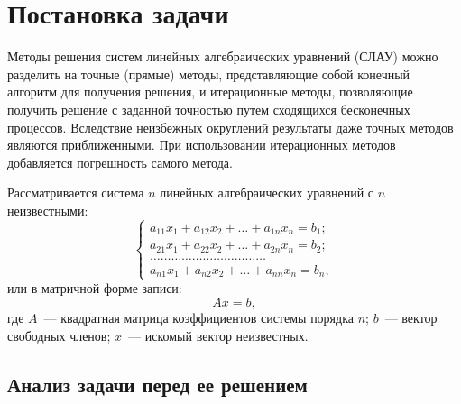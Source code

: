 \chapter{Постановка задачи}

Методы решения систем линейных алгебраических уравнений (СЛАУ) можно разделить на точные (прямые) методы, представляющие собой конечный алгоритм для получения решения, и итерационные методы, позволяющие получить решение с заданной точностью путем сходящихся бесконечных процессов. Вследствие неизбежных округлений результаты даже точных методов являются приближенными. При использовании итерационных методов добавляется погрешность самого метода.

Рассматривается система $n$ линейных алгебраических уравнений с $n$ неизвестными:
\begin{equation}
    \begin{cases}
        a_{11}x_1 + a_{12}x_2 + \ldots + a_{1n}x_n = b_1; \\
        a_{21}x_1 + a_{22}x_2 + \ldots + a_{2n}x_n = b_2; \\
        \dots\dots\dots\dots\dots\dots\dots\dots\dots\dots\dots \\
        a_{n1}x_1 + a_{n2}x_2 + \ldots + a_{nn}x_n = b_n,
    \end{cases}
    \label{eq:slau}
\end{equation}
или в матричной форме записи:
\begin{equation}
    Ax = b,
\end{equation}
где $A$~--- квадратная матрица коэффициентов системы порядка $n$; $b$~--- вектор свободных членов; $x$~--- искомый вектор неизвестных.

\section{Анализ задачи перед ее решением}


